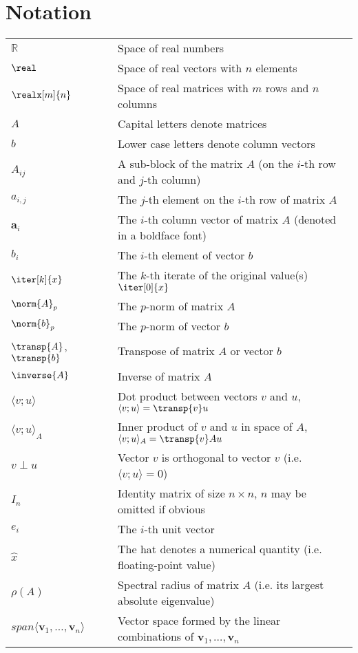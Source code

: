\section{Notation}
\label{sec:notation}


\begin{tabular}{ll}
  $\mathbb{R}$ & Space of real numbers \\
  $\real$ & Space of real vectors with $n$ elements \\
  $\realx[m]{n}$ & Space of real matrices with $m$ rows and $n$ columns \\
  $A$ & Capital letters denote matrices \\
  $b$ & Lower case letters denote column vectors \\
  $A_{ij}$ & A sub-block of the matrix $A$ (on the $i$-th row and $j$-th column) \\
  $a_{i,j}$ & The $j$-th element on the $i$-th row of matrix $A$ \\
  $\bm{a}_{i}$ & The $i$-th column vector of matrix $A$ (denoted in a boldface font) \\
  $b_{i}$ & The $i$-th element of vector $b$ \\
  $\iter[k]{x}$ & The $k$-th iterate of the original value(s) $\iter[0]{x}$\\
  $\norm{A}_p$ & The $p$-norm of matrix $A$ \\
  $\norm{b}_p$ & The $p$-norm of vector $b$ \\
  $\transp{A}$, $\transp{b}$    & Transpose of matrix $A$ or vector $b$\\
  $\inverse{A}$ & Inverse of matrix $A$ \\
  $\langle v;u \rangle$ & Dot product between vectors $v$ and $u$, $\langle v;u \rangle = \transp{v}u$\\
  $\langle v;u \rangle_A$ & Inner product of $v$ and $u$ in space of $A$, $\langle v;u \rangle_A = \transp{v}Au$\\
  $v \perp u$ & Vector $v$ is orthogonal to vector $v$ (i.e. $\langle v;u \rangle = 0$) \\
  $I_n$      & Identity matrix of size $n \times n$, $n$ may be omitted if obvious  \\
  $e_i$      & The $i$-th unit vector \\
  $\hat{x}$ & The hat denotes a numerical quantity (i.e. floating-point value) \\
  $\rho(A)$ & Spectral radius of matrix $A$ (i.e. its largest absolute eigenvalue) \\
  $span\langle \bm{v}_1, \dots, \bm{v}_{n} \rangle$ & Vector space formed by the linear combinations of $\bm{v}_1,\dots,\bm{v}_n$ \\

\end{tabular}
